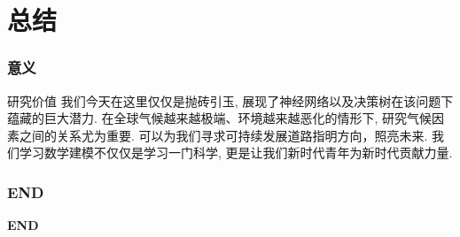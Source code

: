 \documentclass[10pt]{beamer}
\begin{document}
\section{总结}
\begin{frame}
	\frametitle{意义}
	\begin{block}{研究价值}
		我们今天在这里仅仅是抛砖引玉,
		展现了神经网络以及决策树在该问题下蕴藏的巨大潜力.
		在全球气候越来越极端、环境越来越恶化的情形下,
		研究气候因素之间的关系尤为重要.
		可以为我们寻求可持续发展道路指明方向，照亮未来.
		我们学习数学建模不仅仅是学习一门科学,
		更是让我们新时代青年为新时代贡献力量.
	\end{block}
\end{frame}

\begin{frame}
	\frametitle{END}
	\begin{center}
		\Huge
		\textbf{END}
	\end{center}
\end{frame}
\end{document}
